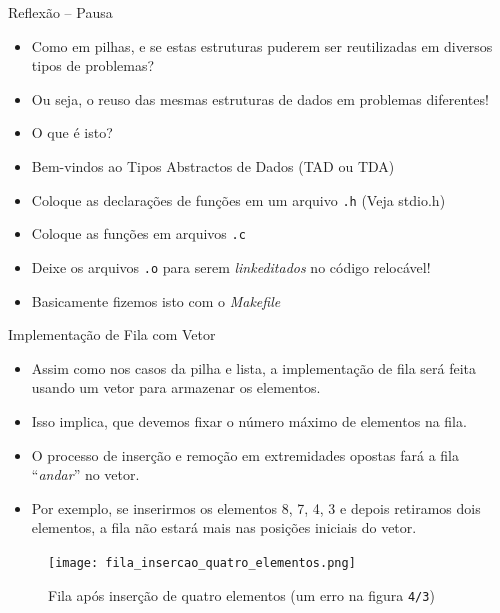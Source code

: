 \begin{frame}{Reflexão -- Pausa}

\begin{block}{}
 \begin{itemize}
   \item Como em pilhas, e se estas estruturas puderem
ser reutilizadas em diversos tipos de problemas?

  \item Ou seja, o reuso das mesmas estruturas de dados
  em problemas diferentes!
  
  \item O que é isto?
  
  \item Bem-vindos ao Tipos Abstractos de Dados (TAD ou TDA)
  

  \item Coloque as declarações de funções em um arquivo \texttt{.h} (Veja stdio.h)
  \item Coloque as funções em arquivos \texttt{.c}
  \item Deixe os arquivos \texttt{.o} para serem \textit{linkeditados} 
  no código relocável!
  \item Basicamente fizemos isto com o \textit{Makefile}
 
 \end{itemize}
 
\end{block}
 
\end{frame}



\begin{frame}{Implementação de Fila com Vetor}
	\begin{itemize}
		\item Assim como nos casos da pilha e lista, a 
		implementação de fila será feita usando um vetor para armazenar os elementos.
		\item Isso implica, que devemos fixar o número máximo de elementos na fila.
		\item O processo de inserção e remoção em extremidades opostas fará a fila ``\textit{andar}'' no vetor.
		\item Por exemplo, se inserirmos os elementos 8, 7, 4, 3 e
		 depois retiramos dois elementos, a fila não estará mais nas
		  posições iniciais do vetor.
	\end{itemize}
	\begin{figure}[ht]
				\centering
				\texttt{[image: fila\_insercao\_quatro\_elementos.png]}
				\caption{Fila após inserção de quatro elementos (um erro na figura \texttt{4/3})}	
	\end{figure} 	
\end{frame}


